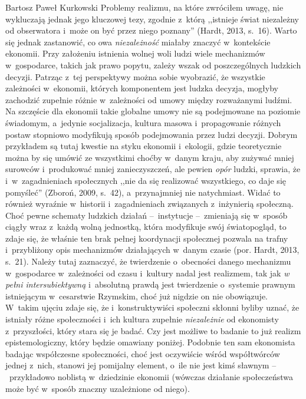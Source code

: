 \begin{artplenv}{Bartosz Paweł Kurkowski}
Problemy realizmu, na które zwróciłem uwagę, nie wykluczają jednak jego kluczowej tezy, zgodnie z~którą ,,istnieje świat
niezależny od obserwatora i~może on być przez niego poznany'' \label{ref:RNDk8xpmUa8wg}(Hardt, 2013, s.~16). Warto się
jednak zastanowić, co owa \textit{niezależność} miałaby znaczyć w~kontekście ekonomii. Przy założeniu istnienia wolnej
woli ludzi wiele mechanizmów w~gospodarce, takich jak prawo popytu, zależy wszak od poszczególnych ludzkich decyzji.
Patrząc z~tej perspektywy można sobie wyobrazić, że wszystkie zależności w~ekonomii, których komponentem jest ludzka
decyzja, mogłyby zachodzić zupełnie różnie w~zależności od umowy między rozważanymi ludźmi. Na szczęście dla ekonomii
takie globalne umowy nie są podejmowane na poziomie świadomym, a~jedynie socjalizacja, kultura masowa i~propagowanie
różnych postaw stopniowo modyfikują sposób podejmowania przez ludzi decyzji. Dobrym przykładem są tutaj kwestie na
styku ekonomii i~ekologii, gdzie teoretycznie można by się umówić ze wszystkimi choćby w~danym kraju, aby zużywać mniej
surowców i~produkować mniej zanieczyszczeń, ale pewien \textit{opór} ludzki, sprawia, że i~w~zagadnieniach społecznych
,,nie da się realizować wszystkiego, co daje się pomyśleć'' \label{ref:RNDlAKpEAAPgk}(Zboroń, 2009, s.~42),
a~przynajmniej nie natychmiast. Widać to również wyraźnie w~historii i~zagadnieniach związanych z~inżynierią społeczną.
Choć pewne schematy ludzkich działań --~instytucje --~zmieniają się w~sposób ciągły wraz z~każdą wolną jednostką, która
modyfikuje swój światopogląd, to zdaje się, że właśnie ten brak pełnej koordynacji społecznej pozwala na
trafny i~przybliżony opis mechanizmów działających w~danym czasie \label{ref:RND8f3KaiWAg4}(por. Hardt, 2013, s.~21). Należy
tutaj zaznaczyć, że twierdzenie o~obecności danego mechanizmu w~gospodarce w~zależności od czasu i~kultury nadal jest
realizmem, tak jak \textit{w pełni intersubiektywną} i~absolutną prawdą jest twierdzenie o~systemie prawnym istniejącym
w~cesarstwie Rzymskim, choć już nigdzie on nie obowiązuje. W~takim ujęciu zdaje się, że i~konstruktywiści społeczni
skłonni byliby uznać, że istniały różne społeczności i~ich kultura zupełnie \textit{niezależnie} od
ekonomisty z~przyszłości, który stara się je badać. Czy jest możliwe to badanie to już realizm epistemologiczny, który będzie
omawiany poniżej. Podobnie ten sam ekonomista badając współczesne społeczności, choć jest oczywiście wśród współtwórców
jednej z~nich, stanowi jej pomijalny element, o~ile nie jest kimś sławnym --~przykładowo noblistą w~dziedzinie ekonomii
(wówczas działanie społeczeństwa może być w~sposób znaczny uzależnione od niego).



\end{artplenv}
